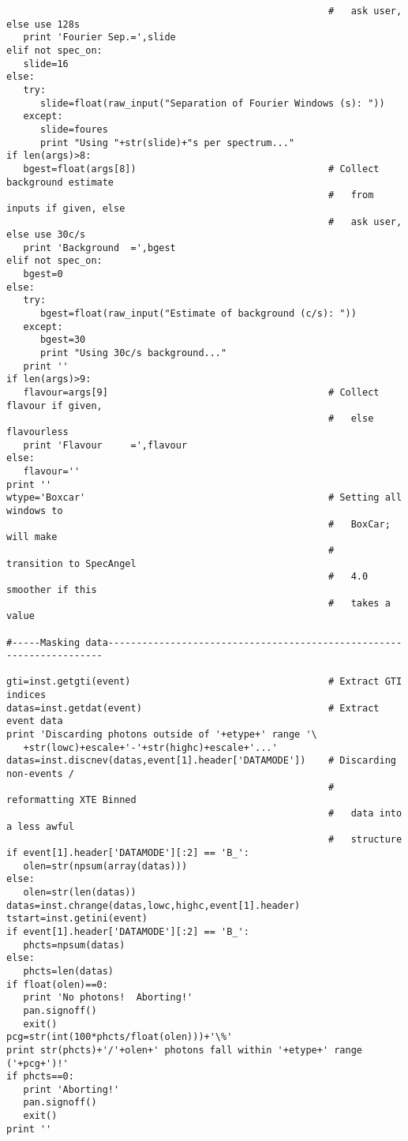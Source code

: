 \begin{verbatim}
                                                         #   ask user, else use 128s
   print 'Fourier Sep.=',slide
elif not spec_on:
   slide=16
else:
   try:
      slide=float(raw_input("Separation of Fourier Windows (s): "))
   except:
      slide=foures
      print "Using "+str(slide)+"s per spectrum..."
if len(args)>8:
   bgest=float(args[8])                                  # Collect background estimate
                                                         #   from inputs if given, else
                                                         #   ask user, else use 30c/s
   print 'Background  =',bgest
elif not spec_on:
   bgest=0
else:   
   try:
      bgest=float(raw_input("Estimate of background (c/s): "))
   except:
      bgest=30
      print "Using 30c/s background..."
   print ''
if len(args)>9:
   flavour=args[9]                                       # Collect flavour if given,
                                                         #   else flavourless
   print 'Flavour     =',flavour
else:
   flavour=''
print ''
wtype='Boxcar'                                           # Setting all windows to
                                                         #   BoxCar; will make 
                                                         #   transition to SpecAngel
                                                         #   4.0 smoother if this
                                                         #   takes a value

#-----Masking data---------------------------------------------------------------------

gti=inst.getgti(event)                                   # Extract GTI indices
datas=inst.getdat(event)                                 # Extract event data
print 'Discarding photons outside of '+etype+' range '\
   +str(lowc)+escale+'-'+str(highc)+escale+'...'
datas=inst.discnev(datas,event[1].header['DATAMODE'])    # Discarding non-events /
                                                         #   reformatting XTE Binned
                                                         #   data into a less awful
                                                         #   structure
if event[1].header['DATAMODE'][:2] == 'B_':
   olen=str(npsum(array(datas)))
else:
   olen=str(len(datas))
datas=inst.chrange(datas,lowc,highc,event[1].header)
tstart=inst.getini(event)
if event[1].header['DATAMODE'][:2] == 'B_':
   phcts=npsum(datas)
else:
   phcts=len(datas)
if float(olen)==0:
   print 'No photons!  Aborting!'
   pan.signoff()
   exit()
pcg=str(int(100*phcts/float(olen)))+'\%'
print str(phcts)+'/'+olen+' photons fall within '+etype+' range ('+pcg+')!'
if phcts==0:
   print 'Aborting!'
   pan.signoff()
   exit()
print ''


\end{verbatim}
